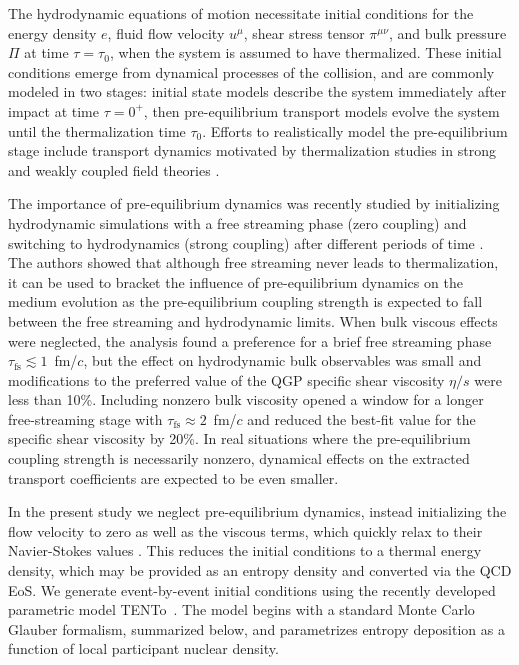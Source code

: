 \documentclass[aps,prc,reprint,amsmath,nofootinbib]{revtex4-1}
\newcommand{\trento}{T\raisebox{-0.5ex}{R}ENTo}
\begin{document}
The hydrodynamic equations of motion necessitate initial conditions for the energy density $e$, fluid flow velocity $u^\mu$, shear stress tensor $\pi^{\mu\nu}$, and bulk pressure $\Pi$ at time $\tau = \tau_0$, when the system is assumed to have thermalized.
These initial conditions emerge from dynamical processes of the collision, and are commonly modeled in two stages: initial state models describe the system immediately after impact at time $\tau=0^+$, then pre-equilibrium transport models evolve the system until the thermalization time $\tau_0$.
Efforts to realistically model the pre-equilibrium stage include transport dynamics \cite{Schenke:2012wb, Schenke:2012fw, vanderSchee:2013pia, vanderSchee:2015rta, Chesler:2015fpa} motivated by thermalization studies in strong and weakly coupled field theories \cite{Romatschke:2006nk, Krasnitz:2002ng, Berges:2013eia, Arnold:2004ti, Kurkela:2011ti, Heller:2012km, vanderSchee:2013pia, Rebhan:2004ur, Heller:2011ju, Janik:2006gp}.

The importance of pre-equilibrium dynamics was recently studied by initializing hydrodynamic simulations with a free streaming phase (zero coupling) and switching to hydrodynamics (strong coupling) after different periods of time \cite{Liu:2015nwa, Heinz:2015arc}.
The authors showed that although free streaming never leads to thermalization, it can be used to bracket the influence of pre-equilibrium dynamics on the medium evolution as the pre-equilibrium coupling strength is expected to fall between the free streaming and hydrodynamic limits.
When bulk viscous effects were neglected, the analysis found a preference for a brief free streaming phase $\tau_\text{fs} \lesssim 1$~fm/$c$, but the effect on hydrodynamic bulk observables was small and modifications to the preferred value of the QGP specific shear viscosity $\eta/s$ were less than 10\%.
Including nonzero bulk viscosity opened a window for a longer free-streaming stage with $\tau_\mathrm{fs} \approx 2$~fm/$c$ and reduced the best-fit value for the specific shear viscosity by 20\%.
In real situations where the pre-equilibrium coupling strength is necessarily nonzero, dynamical effects on the extracted transport coefficients are expected to be even smaller.

In the present study we neglect pre-equilibrium dynamics, instead initializing the flow velocity to zero as well as the viscous terms, which quickly relax to their Navier-Stokes values \cite{Song:2009rh}.
This reduces the initial conditions to a thermal energy density, which may be provided as an entropy density and converted via the QCD EoS.
We generate event-by-event initial conditions using the recently developed parametric model \trento\ \cite{Moreland:2014oya}.
The model begins with a standard Monte Carlo Glauber formalism, summarized below, and parametrizes entropy deposition as a function of local participant nuclear density.
\end{document}

